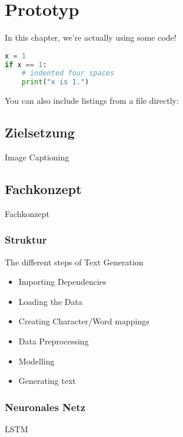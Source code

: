 \chapter{Prototyp}\label{ch:method}

In this chapter, we're actually using some code!

\begin{lstlisting}[language=Python,caption={This is an example of inline listing},captionpos=b]
x = 1
if x == 1:
    # indented four spaces
    print("x is 1.")

\end{lstlisting}

You can also include listings from a file directly:



\section{Zielsetzung}

Image Captioning

\section{Fachkonzept}

Fachkonzept

\subsection{Struktur}

The different steps of Text Generation

\begin{itemize}
\item Importing Dependencies
\item Loading the Data
\item Creating Character/Word mappings
\item Data Preprocessing
\item Modelling
\item Generating text
\end{itemize}

\subsection{Neuronales Netz}

LSTM



